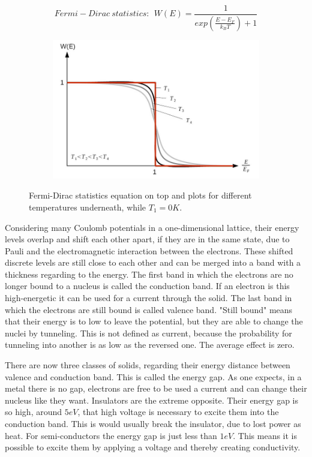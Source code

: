 \documentclass[]{article}
\begin{document}
\begin{figure}[H]
\centering
\begin{subfigure}[b]{1\textwidth}
	\centering
	\begin{equation}
	Fermi-Dirac \ statistics: \:\: W(E) = \frac{1}{exp\left(\frac{E-E_F}{k_B T}\right)+1} 
	\end{equation}
\end{subfigure}
\begin{subfigure}[b]{1\textwidth}
	\centering
	\includegraphics[width=.7\textwidth]{Plots/fd.png}
\end{subfigure}
\caption{Fermi-Dirac statistics equation on top and plots for different temperatures underneath, while $T_1=0K$. \cite{wiki}}
\end{figure}

Considering many Coulomb potentials in a one-dimensional lattice, their energy levels overlap and shift each other apart, if they are in the same state, due to Pauli and the electromagnetic interaction between the electrons. These shifted discrete levels are still close to each other and can be merged into a band with a thickness regarding to the energy. The first band in which the electrons are no longer bound to a nucleus is called the conduction band. If an electron is this high-energetic it can be used for a current through the solid. The last band in which the electrons are still bound is called valence band. "Still bound" means that their energy is to low to leave the potential, but they are able to change the nuclei by tunneling. This is not defined as current, because the probability for tunneling into another is as low as the reversed one. The average effect is zero.

There are now three classes of solids, regarding their energy distance between valence and conduction band. This is called the energy gap. As one expects, in a metal there is no gap, electrons are free to be used a current and can change their nucleus like they want. Insulators are the extreme opposite. Their energy gap is so high, around $5eV$, that high voltage is necessary to excite them into the conduction band. This is would usually break the insulator, due to lost power as heat. 
For semi-conductors the energy gap is just less than $1eV$. This means it is possible to excite them by applying a voltage and thereby creating conductivity.
\end{document}
